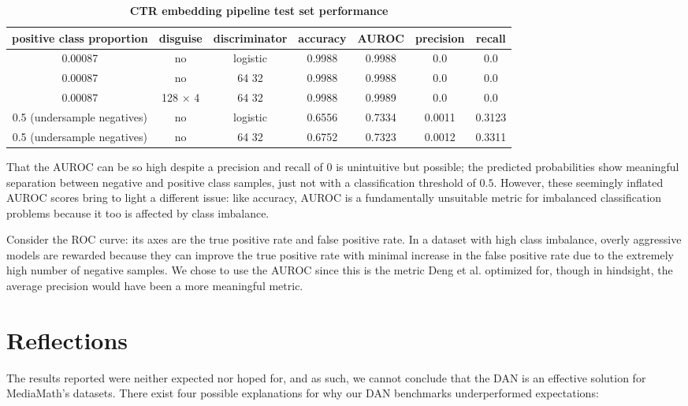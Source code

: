 \documentclass{proc}
\begin{document}
\begin{table}[]
\begin{center}
	\begin{tabular}{|c|c|c|c|c|c|c|}
		\hline
 		\textbf{positive class proportion} & \textbf{disguise} & \textbf{discriminator} & \textbf{accuracy} & \textbf{AUROC} & \textbf{precision} & \textbf{recall} \\ \hline
 		0.00087 & no & logistic & 0.9988 & 0.9988 & 0.0 & 0.0 \\ \hline
 		0.00087 & no & 64 32 & 0.9988 & 0.9988 & 0.0 & 0.0 \\ \hline
 		0.00087 & 128 $\times$ 4 & 64 32 & 0.9988 & 0.9989 & 0.0 & 0.0 \\ \hline
  		0.5 (undersample negatives) & no & logistic & 0.6556 & 0.7334 & 0.0011 & 0.3123 \\ \hline
 		0.5 (undersample negatives) & no & 64 32 & 0.6752 & 0.7323 & 0.0012 & 0.3311 \\ \hline
	\end{tabular}
	\caption{\textbf{CTR embedding pipeline test set performance}}
	\label{table:ctr-embedding-results}
\end{center}
\end{table}

That the AUROC can be so high despite a precision and recall of $0$ is unintuitive but possible; the predicted probabilities show meaningful separation between negative and positive class samples, just not with a classification threshold of $0.5$. However, these seemingly inflated AUROC scores bring to light a different issue: like accuracy, AUROC is a fundamentally unsuitable metric for imbalanced classification problems because it too is affected by class imbalance.

Consider the ROC curve: its axes are the true positive rate and false positive rate. In a dataset with high class imbalance, overly aggressive models are rewarded because they can improve the true positive rate with minimal increase in the false positive rate due to the extremely high number of negative samples. We chose to use the AUROC since this is the metric Deng et al. optimized for, though in hindsight, the average precision would have been a more meaningful metric.

\section{Reflections}

The results reported were neither expected nor hoped for, and as such, we cannot conclude that the DAN is an effective solution for MediaMath's datasets. There exist four possible explanations for why our DAN benchmarks underperformed expectations:
\end{document}
